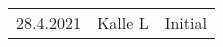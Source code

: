 \begin{center}
	\begin{tabular}{ c c c }
		28.4.2021 & Kalle L & Initial \\ 
	\end{tabular}
\end{center}